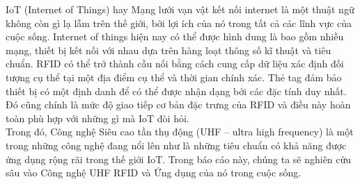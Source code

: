 \cleardoublepage
{}

\begin{abstracts}
IoT (Internet of Things) hay Mạng lưới vạn vật kết nối internet là một thuật ngữ không còn gì lạ lẫm trên thế giới, bởi lợi ích của nó trong tất cả các lĩnh vực của cuộc sống. Internet of things hiện nay có thể được hình dung là bao gồm nhiều mạng, thiết bị kết nối với nhau dựa trên hàng loạt thông số kĩ thuật và tiêu chuẩn. RFID có thể trở thành cầu nối bằng cách cung cấp dữ liệu xác định đối tượng cụ thể tại một địa điểm cụ thể và thời gian chính xác. Thẻ tag đảm bảo thiết bị có một định danh để có thể được nhận dạng bởi các đặc tính duy nhất. Đó cũng chính là mức độ giao tiếp cơ bản đặc trưng của RFID và điều này hoàn toàn phù hợp với những gì mà IoT đòi hỏi.\\
Trong đó, Công nghệ Siêu cao tần thụ động (UHF – ultra high frequency) là một trong những công nghệ đang nổi lên như là những tiêu chuẩn có khả năng được ứng dụng rộng rãi trong thế giới IoT. Trong báo cáo này, chúng ta sẽ nghiên cứu sâu vào Công nghệ UHF RFID và Ứng dụng của nó trong cuộc sống.
\end{abstracts}

